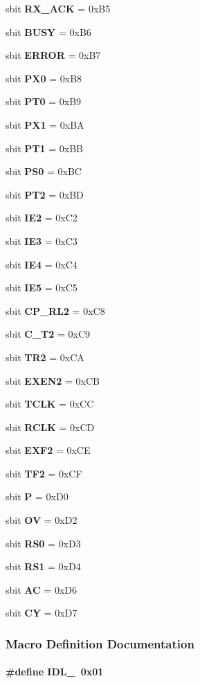 \begin{DoxyCompactItemize}
sbit {\bf R\+X\+\_\+\+A\+CK} = 0x\+B5
\item 
sbit {\bf B\+U\+SY} = 0x\+B6
\item 
sbit {\bf E\+R\+R\+OR} = 0x\+B7
\item 
sbit {\bf P\+X0} = 0x\+B8
\item 
sbit {\bf P\+T0} = 0x\+B9
\item 
sbit {\bf P\+X1} = 0x\+BA
\item 
sbit {\bf P\+T1} = 0x\+BB
\item 
sbit {\bf P\+S0} = 0x\+BC
\item 
sbit {\bf P\+T2} = 0x\+BD
\item 
sbit {\bf I\+E2} = 0x\+C2
\item 
sbit {\bf I\+E3} = 0x\+C3
\item 
sbit {\bf I\+E4} = 0x\+C4
\item 
sbit {\bf I\+E5} = 0x\+C5
\item 
sbit {\bf C\+P\+\_\+\+R\+L2} = 0x\+C8
\item 
sbit {\bf C\+\_\+\+T2} = 0x\+C9
\item 
sbit {\bf T\+R2} = 0x\+CA
\item 
sbit {\bf E\+X\+E\+N2} = 0x\+CB
\item 
sbit {\bf T\+C\+LK} = 0x\+CC
\item 
sbit {\bf R\+C\+LK} = 0x\+CD
\item 
sbit {\bf E\+X\+F2} = 0x\+CE
\item 
sbit {\bf T\+F2} = 0x\+CF
\item 
sbit {\bf P} = 0x\+D0
\item 
sbit {\bf OV} = 0x\+D2
\item 
sbit {\bf R\+S0} = 0x\+D3
\item 
sbit {\bf R\+S1} = 0x\+D4
\item 
sbit {\bf AC} = 0x\+D6
\item 
sbit {\bf CY} = 0x\+D7
\end{DoxyCompactItemize}


\subsubsection{Macro Definition Documentation}
\paragraph[{I\+D\+L\+\_\+}]{\setlength{\rightskip}{0pt plus 5cm}\#define I\+D\+L\+\_\+~0x01}\label{LMS7002__REGx51_8h_ae2650c68903f54a7399b0415a5604500}


